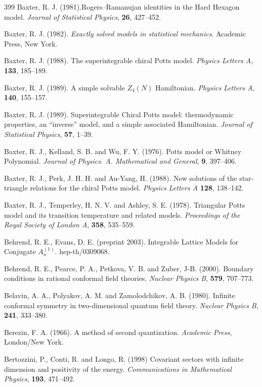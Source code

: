 \documentclass[12pt]{article}
\theoremstyle{plain}
\theoremstyle{definition}
\numberwithin{equation}{section}
\begin{document}
\begin{thebibliography} {399}
Baxter, R. J. (1981).Rogers--Ramanujan identities in the Hard Hexagon model. {\em  Journal of Statistical Physics}, {\bf 26},
427--452.

Baxter, R. J. (1982). {\em Exactly solved models in statistical mechanics}.
Academic Press, New York.

Baxter, R. J. (1988). The superintegrable chiral Potts model. {\em Physics Letters A}, {\bf 133}, 185--189.

Baxter, R. J. (1989). A simple solvable  $Z_4(N)$ Hamiltonian.
{\em Physics Letters A}, {\bf 140}, 155--157.

Baxter, R. J. (1989). Superintegrable Chiral Potts model: thermodynamic 
properties,  an ``inverse'' model, and a simple associated Hamiltonian. {\em Journal of Statistical
Physics}, {\bf 57}, 1--39.

Baxter, R. J., Kelland, S. B. and Wu, F. Y. (1976). Potts model or Whitney Polynomial.
{\em Journal of Physics. A. Mathematical and General},
{\bf 9}, 397--406.

Baxter, R. J., Perk, J. H. H. and  Au-Yang, H.  (1988). New solutions of the star-triangle relations for the chiral Potts model. {\em Physics Letters A} {\bf 128},  138--142.

Baxter, R. J., Temperley, H. N. V. and Ashley, S. E. (1978).
Triangular Potts model and its transition temperature and related models.
{\em Proceedings of the Royal Society of London A},
{\bf 358}, 535--559.

Behrend, R. E., Evans, D. E. (preprint 2003). Integrable Lattice Models for Conjugate $A^{(1)}_n$.
hep-th/0309068.

Behrend, R. E., Pearce, P. A., Petkova, V. B. and Zuber, J-B.  (2000).
Boundary conditions in rational conformal field theories.
{\em Nuclear Physics B}, {\bf 579}, 707--773.

Belavin, A. A., Polyakov, A. M. and Zamolodchikov, A. B. (1980). 
Infinite conformal symmetry in two-dimensional quantum field theory.
{\em Nuclear Physics B}, {\bf 241}, 333--380.

Berezin, F. A. (1966). A method of second quantization. {\em Academic Press}, London/New York.

Bertozzini, P., Conti, R. and Longo, R. (1998) Covariant sectors with infinite dimension and positivity of the energy.
{\em Communications in Mathematical Physics}, {\bf 193}, 471--492.


\end{thebibliography}
\end{document}
